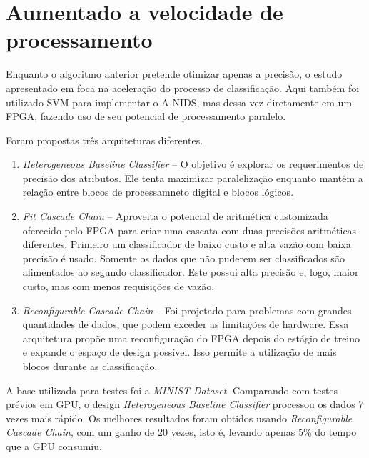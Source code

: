 \section{Aumentado a velocidade de processamento}
Enquanto o algoritmo anterior pretende otimizar apenas a precisão, o estudo apresentado em \cite{papadonikolakis12}
foca na aceleração do processo de classificação. Aqui também foi utilizado SVM para implementar o A-NIDS, mas dessa
vez diretamente em um FPGA, fazendo uso de seu potencial de processamento paralelo.
\par Foram propostas três arquiteturas diferentes.
\begin{enumerate}
    \item \textit{Heterogeneous Baseline Classifier} -- O objetivo é explorar os requerimentos de precisão dos atributos. Ele
    tenta maximizar paralelização enquanto mantém a relação entre blocos de processamneto digital e blocos lógicos.
    \item \textit{Fit Cascade Chain} -- Aproveita o potencial de aritmética customizada oferecido pelo FPGA para criar uma
    cascata com duas precisões aritméticas diferentes. Primeiro um classificador de baixo custo e alta vazão com baixa
    precisão é usado. Somente os dados que não puderem ser classificados são alimentados ao segundo classificador. Este
    possui alta precisão e, logo, maior custo, mas com menos requisições de vazão.
    \item \textit{Reconfigurable Cascade Chain} -- Foi projetado para problemas com grandes quantidades de dados, que podem
    exceder as limitações de hardware. Essa arquitetura propõe uma reconfiguração do FPGA depois do estágio de treino e
    expande o espaço de design possível. Isso permite a utilização de mais blocos durante as classificação.
\end{enumerate}
\par A base utilizada para testes foi a \textit{MINIST Dataset}. Comparando com testes prévios em GPU, o design
\textit{Heterogeneous Baseline Classifier} processou os dados 7 vezes mais rápido. Os melhores resultados foram
obtidos usando \textit{Reconfigurable Cascade Chain}, com um ganho de 20 vezes, isto é, levando apenas 5\% do tempo
que a GPU consumiu.